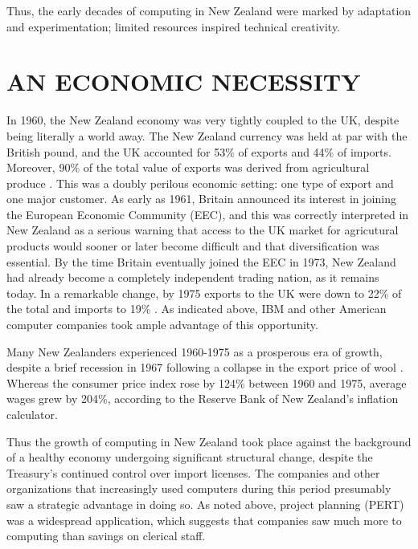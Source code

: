 \documentclass{IEEEcsmag}
\begin{document}
Thus, the early decades of computing in New Zealand were marked by adaptation and experimentation; limited resources inspired technical creativity.
\vspace*{-8pt}
\section{AN ECONOMIC NECESSITY}
\cbend
In 1960, the New Zealand economy was very tightly coupled to the UK, despite being literally a world away.
The New Zealand currency was held at par with the British pound, and the UK accounted for 53\% of exports and 44\% of imports.
Moreover, 90\% of the total value of exports was derived from agricultural produce \cite{Yearbook62}. 
This was a doubly perilous economic setting: one type of export and one major customer.
As early as 1961, Britain announced its interest in joining the European Economic Community (EEC),
and this was correctly interpreted in New Zealand as a serious warning that access to the UK market 
for agricutural products would sooner or later become difficult and that diversification was essential. By the time
Britain eventually joined the EEC in 1973, New Zealand had already become a completely independent
trading nation, as it remains today. In a remarkable change, by 1975 exports to the UK were down to 22\%
of the total and imports to 19\% \cite{Yearbook77}. 
As indicated above, IBM and other American computer companies took ample advantage of this opportunity.

\cbstart
Many New Zealanders experienced 1960-1975 as a prosperous era of growth,
despite a brief recession in 1967 \cite{Hall-2014} following a collapse in the export price of wool \cite{Easton-2020}.
Whereas the consumer price index rose by 124\% between 1960 and 1975, average wages grew by
204\%, according to the Reserve Bank of New Zealand’s inflation calculator.

Thus the growth of computing in New Zealand took place against the background of a
healthy economy undergoing significant structural change, despite the Treasury’s continued
control over import licenses.
\cbend
The companies and other organizations that increasingly used computers during this period
presumably saw a strategic advantage in doing so. As noted above, project planning (PERT)
was a widespread application, which suggests that companies saw much more to computing than
savings on clerical staff. 
\end{document}
